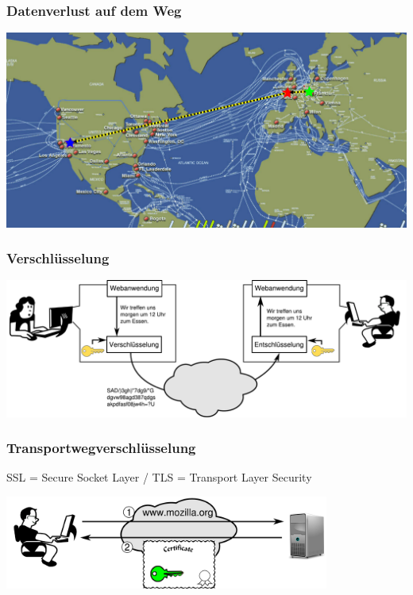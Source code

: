\documentclass[12pt]{beamer}
\begin{document}
\begin{frame}
    \frametitle{Datenverlust auf dem Weg}
    \begin{center}
      \includegraphics[height=0.7\textheight]{img/internetmap-abhoeren-ssl}
    \end{center}
\end{frame}

\begin{frame}
    \frametitle{Verschlüsselung}
    \begin{center}
	\includegraphics[width=\textwidth]{img/krypto.pdf}
    \end{center}	
\end{frame}

\begin{frame}
    \frametitle{Transportwegverschlüsselung}
      SSL = Secure Socket Layer / TLS = Transport Layer Security
    \vfill
    \begin{center}
      \includegraphics[width=0.8\textwidth]{img/tls.pdf}
    \end{center}
\end{frame}
\end{document}
